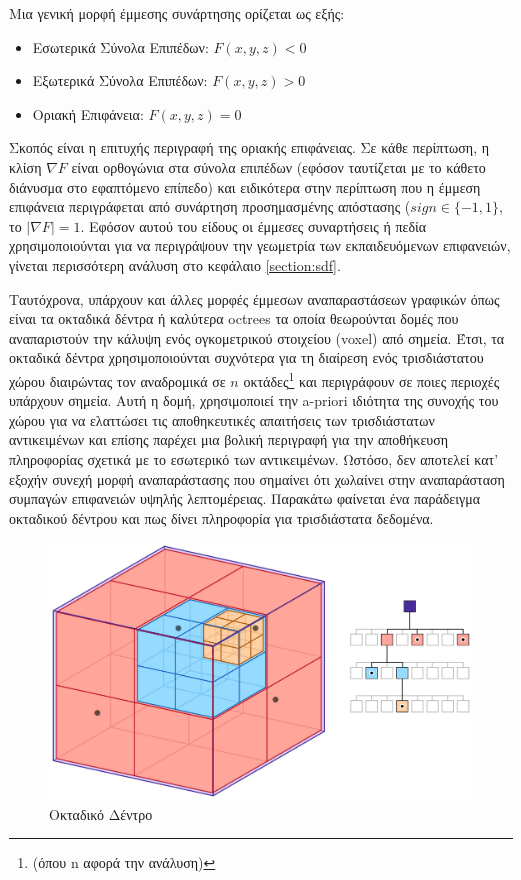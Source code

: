 \clearpage
\par 
    Μια γενική μορφή έμμεσης συνάρτησης ορίζεται ως εξής:
    \begin{itemize}
        \item Εσωτερικά Σύνολα Επιπέδων: $F(x, y, z)<0$
        \item Εξωτερικά Σύνολα Επιπέδων: $F(x, y, z)>0$
        \item Οριακή Επιφάνεια: $F(x, y, z)=0$
    \end{itemize}
    Σκοπός είναι η επιτυχής περιγραφή της οριακής επιφάνειας.
    Σε κάθε περίπτωση, η κλίση $\nabla{F}$ είναι ορθογώνια στα σύνολα επιπέδων (εφόσον ταυτίζεται με το κάθετο διάνυσμα στο εφαπτόμενο επίπεδο) και ειδικότερα στην περίπτωση που η έμμεση επιφάνεια περιγράφεται από συνάρτηση προσημασμένης απόστασης (\(sign \in \{-1,1\}\), το $|\nabla F| = 1$. Εφόσον αυτού του είδους οι έμμεσες συναρτήσεις ή πεδία χρησιμοποιούνται για να περιγράψουν την γεωμετρία των εκπαιδευόμενων επιφανειών, γίνεται  περισσότερη ανάλυση στο κεφάλαιο \ref{section:sdf}. \\
\par    
    Ταυτόχρονα, υπάρχουν και άλλες μορφές έμμεσων αναπαραστάσεων γραφικών όπως είναι τα οκταδικά δέντρα \cite{hearn2011computer} ή καλύτερα octrees τα οποία θεωρούνται δομές που αναπαριστούν την κάλυψη ενός ογκομετρικού στοιχείου (voxel) από σημεία. Έτσι,  τα οκταδικά δέντρα χρησιμοποιούνται συχνότερα για τη διαίρεση ενός τρισδιάστατου χώρου διαιρώντας τον αναδρομικά σε \(n\) οκτάδες\footnote{(όπου n αφορά την ανάλυση)} και περιγράφουν σε ποιες περιοχές υπάρχουν σημεία. Αυτή η δομή, χρησιμοποιεί την a-priori ιδιότητα της συνοχής του χώρου για να ελαττώσει τις αποθηκευτικές απαιτήσεις των τρισδιάστατων αντικειμένων και επίσης παρέχει μια βολική περιγραφή για την αποθήκευση πληροφορίας σχετικά με το εσωτερικό των αντικειμένων. Ωστόσο, δεν αποτελεί κατ' εξοχήν συνεχή μορφή αναπαράστασης που σημαίνει ότι χωλαίνει στην αναπαράσταση συμπαγών επιφανειών υψηλής λεπτομέρειας. Παρακάτω φαίνεται ένα παράδειγμα οκταδικού δέντρου και πως δίνει πληροφορία για τρισδιάστατα δεδομένα. 
    \begin{figure}[H]
        \centering
        \includegraphics[width=.8\linewidth]{images/chapter2_img/octree.jpg}
        \caption{Οκταδικό Δέντρο}
        \label{fig:octree}
    \end{figure}
